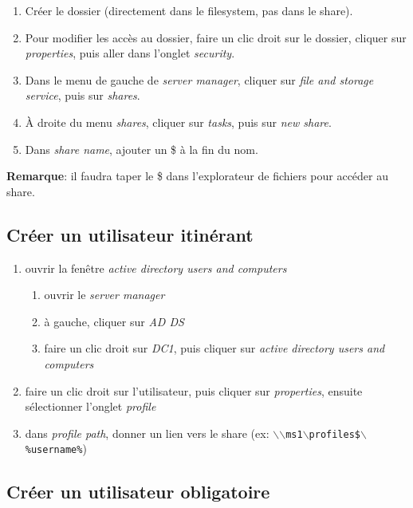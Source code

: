\documentclass[a4paper]{article}
\begin{document}
\begin{enumerate}
    \item Créer le dossier (directement dans le filesystem, pas dans le share).
    \item Pour modifier les accès au dossier, faire un clic droit sur le dossier, cliquer sur \textit{properties}, puis aller dans l'onglet \textit{security}.
    \item Dans le menu de gauche de \textit{server manager}, cliquer sur \textit{file and storage service}, puis sur \textit{shares}.
    \item À droite du menu \textit{shares}, cliquer sur \textit{tasks}, puis sur \textit{new share}.
    \item Dans \textit{share name}, ajouter un \$ à la fin du nom.
\end{enumerate}
\textbf{Remarque}: il faudra taper le \$ dans l'explorateur de fichiers pour accéder au share.






\subsection{Créer un utilisateur itinérant} \label{sec:utilisateuritinerant}



\begin{enumerate}
    \item ouvrir la fenêtre \textit{active directory users and computers}
    \begin{enumerate}
        \item ouvrir le \textit{server manager}
        \item à gauche, cliquer sur \textit{AD DS}
        \item faire un clic droit sur \textit{DC1}, puis cliquer sur \textit{active directory users and computers}
    \end{enumerate}
    \item faire un clic droit sur l'utilisateur, puis cliquer sur \textit{properties}, ensuite sélectionner l'onglet \textit{profile}
    \item dans \textit{profile path}, donner un lien vers le share (ex: \texttt{$\backslash$$\backslash$ms1$\backslash$profiles\$$\backslash$\%username\%})
\end{enumerate}





\subsection{Créer un utilisateur obligatoire}
\end{document}
